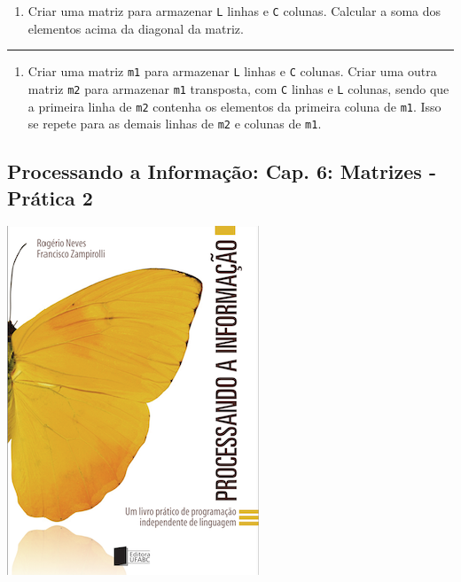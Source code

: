 \documentclass[12pt,a4paper]{article}
\renewcommand{\linethickness}{0.05em}
\providecommand{\tightlist}{%
      \setlength{\itemsep}{0pt}\setlength{\parskip}{0pt}}
\begin{document}
\begin{enumerate}
\def\labelenumi{\arabic{enumi}.}
\setcounter{enumi}{3}
\tightlist
\item
  Criar uma matriz para armazenar \texttt{L} linhas e \texttt{C}
  colunas. Calcular a soma dos elementos acima da diagonal da matriz.
\end{enumerate}

    \begin{center}\rule{0.5\linewidth}{\linethickness}\end{center}

\begin{enumerate}
\def\labelenumi{\arabic{enumi}.}
\setcounter{enumi}{4}
\tightlist
\item
  Criar uma matriz \texttt{m1} para armazenar \texttt{L} linhas e
  \texttt{C} colunas. Criar uma outra matriz \texttt{m2} para armazenar
  \texttt{m1} transposta, com \texttt{C} linhas e \texttt{L} colunas,
  sendo que a primeira linha de \texttt{m2} contenha os elementos da
  primeira coluna de \texttt{m1}. Isso se repete para as demais linhas
  de \texttt{m2} e colunas de \texttt{m1}.
\end{enumerate}

    \hypertarget{processando-a-informauxe7uxe3o-cap.-6-matrizes---pruxe1tica-2}{%
\subsection{Processando a Informação: Cap. 6: Matrizes - Prática
2}\label{processando-a-informauxe7uxe3o-cap.-6-matrizes---pruxe1tica-2}}

    \includegraphics{"figs/Capa_Processando_Informacao.jpg"}
\end{document}
